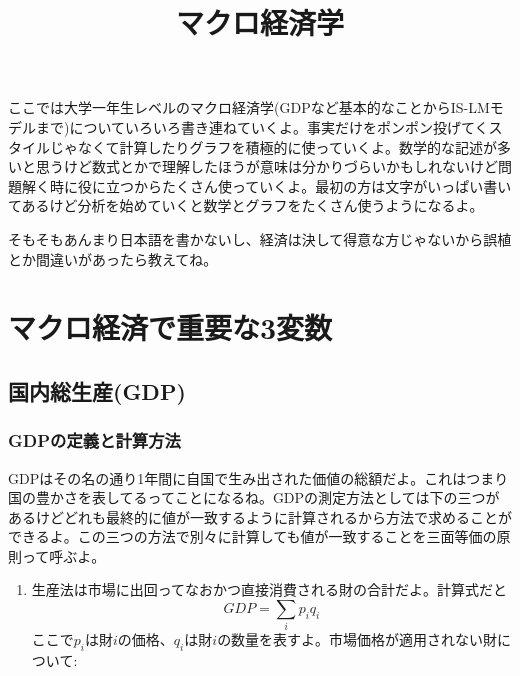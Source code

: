 \documentclass[dvipdfmx,a4paper, 12pt]{article}
\begin{document}
\setlength{\abovedisplayskip}{1pt}
\setlength{\belowdisplayskip}{1pt}

\onehalfspacing

\title{マクロ経済学}
\author{}
\date{}
\maketitle

\newpage

\tableofcontents

\newpage

\begin{Introduction}
ここでは大学一年生レベルのマクロ経済学(GDPなど基本的なことからIS-LMモデルまで)についていろいろ書き連ねていくよ。事実だけをポンポン投げてくスタイルじゃなくて計算したりグラフを積極的に使っていくよ。数学的な記述が多いと思うけど数式とかで理解したほうが意味は分かりづらいかもしれないけど問題解く時に役に立つからたくさん使っていくよ。最初の方は文字がいっぱい書いてあるけど分析を始めていくと数学とグラフをたくさん使うようになるよ。

そもそもあんまり日本語を書かないし、経済は決して得意な方じゃないから誤植とか間違いがあったら教えてね。

\newpage

\section{マクロ経済で重要な3変数}
\subsection{国内総生産(GDP)}
\subsubsection{GDPの定義と計算方法}
GDPはその名の通り1年間に自国で生み出された価値の総額だよ。これはつまり国の豊かさを表してるってことになるね。GDPの測定方法としては下の三つがあるけどどれも最終的に値が一致するように計算されるから方法で求めることができるよ。この三つの方法で別々に計算しても値が一致することを三面等価の原則って呼ぶよ。
\begin{enumerate}
  \item 生産法は市場に出回ってなおかつ直接消費される財の合計だよ。計算式だと
\begin{equation*}
    GDP=\sum_i p_iq_i
\end{equation*}
ここで$p_i$は財$i$の価格、$q_i$は財$i$の数量を表すよ。市場価格が適用されない財について:


\end{enumerate}
\end{Introduction}
\end{document}
